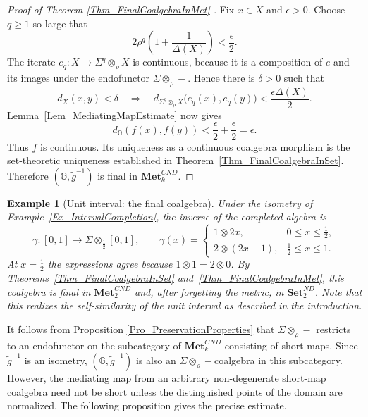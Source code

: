 \documentclass{sn-jnl}%
\theoremstyle{thmstyleone}%
\theoremstyle{thmstyletwo}%
\newtheorem{example}{Example}%
\theoremstyle{thmstylethree}%
\newcommand{\mcnd}{\mathbf{Met}_{k}^{CND}}
\newcommand{\mcndk}[1]{\mathbf{Met}_{#1}^{CND}}
\newcommand{\setndk}[1]{\mathbf{Set}_{#1}^{ND}}
\newcommand{\M}{\Sigma}
\newcommand{\Fw}{\M\otimes_{\w}}
\newcommand{\Fww}[1]{\M\otimes_{#1}}
\newcommand{\Fwi}[1]{\M^{#1}\otimes_{\w}}
\newcommand{\G}{\mathbb{G}}
\newcommand{\g}{\tilde{g}^{-1}}
\newcommand{\w}{\rho}
\begin{document}
\begin{proof}[Proof of Theorem \ref{Thm_FinalCoalgebraInMet} ]
Fix $x\in X$ and $\epsilon>0$.  Choose $q\geq1$ so large that
\begin{equation} 
\nonumber
    2\w^q\left(1+\frac{1}{\Delta(X)}\right)<\frac{\epsilon}{2}.
\end{equation}
The iterate $e_q:X\rightarrow\Fwi{q}X$ is continuous, because it is a composition of $e$ and its images under the endofunctor $\Fw-$.  Hence there is $\delta>0$ such that
\begin{equation} 
\nonumber
    d_X(x,y)<\delta  \quad \Longrightarrow \quad  d_{\Fwi{q}X}\bigl(e_q(x),e_q(y)\bigr)  <\frac{\epsilon\Delta(X)}{2}.
\end{equation}
Lemma~\ref{Lem_MediatingMapEstimate} now gives
\begin{equation} 
\nonumber
    d_\G(f(x),f(y))<\frac{\epsilon}{2}+\frac{\epsilon}{2} = \epsilon.
\end{equation}
Thus $f$ is continuous. Its uniqueness as a continuous coalgebra morphism is the set-theoretic uniqueness established in Theorem~\ref{Thm_FinalCoalgebraInSet}.  Therefore $(\G,\g)$ is final in $\mcnd$.
\end{proof}

\begin{example}[Unit interval: the final coalgebra]
\label{Ex_IntervalFinalCoalgebra}
    Under the isometry of Example~\ref{Ex_IntervalCompletion}, the inverse of the completed algebra is 
    \begin{equation} \nonumber
        \gamma:[0,1]\longrightarrow \Fww{\frac12}[0,1], \qquad \gamma(x)=
        \begin{cases}
            1\otimes2x, & 0\leq x\leq\frac12,\\[1mm]
            2\otimes(2x-1), & \frac12\leq x\leq1.
        \end{cases}
    \end{equation}
    At $x=\frac12$ the expressions agree because $1\otimes1=2\otimes0$. By Theorems~\ref{Thm_FinalCoalgebraInSet} and~\ref{Thm_FinalCoalgebraInMet}, this coalgebra is final in $\mcndk{2}$ and, after forgetting the metric, in $\setndk{2}$. Note that this realizes the self-similarity of the unit interval as described in the introduction.
\end{example}

 It follows from Proposition \ref{Pro_PreservationProperties} that $\Fw-$ restricts to an endofunctor on the subcategory of $\mcnd$ consisting of short maps. Since $\g$ is an isometry, $(\G,\g)$ is also an $\Fw-$coalgebra in this subcategory. However, the mediating map from an arbitrary non-degenerate short-map coalgebra need not be short unless the distinguished points of the domain are normalized. The following proposition gives the precise estimate.
\end{document}
